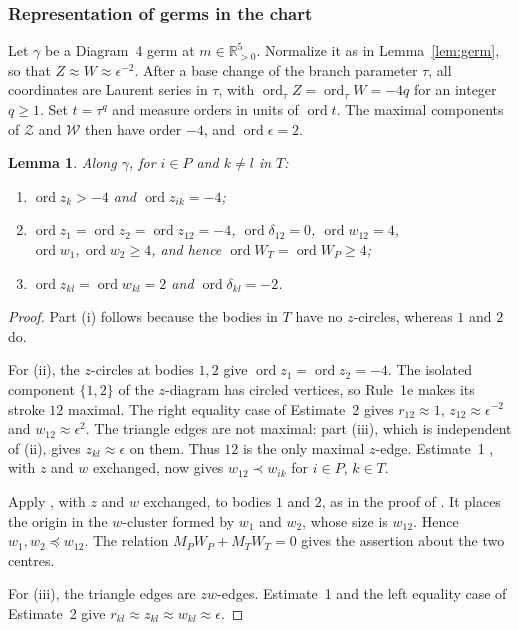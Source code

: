\documentclass[Threeside,11pt]{article}
\newtheorem{lemma}[theorem]{Lemma}
\theoremstyle{definition}
\theoremstyle{remark}
\numberwithin{equation}{section}
\theoremstyle{remark}
\newcommand{\Rp}{\mathbb{R}_{>0}}
\newcommand{\ord}{\operatorname{ord}}
\newenvironment{romanlist}{\begin{enumerate}\renewcommand{\labelenumi}{(\roman{enumi})}%
  \renewcommand{\theenumi}{\roman{enumi}}}{\end{enumerate}}
\begin{document}
\subsubsection{Representation of germs in the chart}\label{d4-cover}
{Let $\gamma$ be a Diagram~4 germ at $m\in\Rp^5$.
Normalize it as in Lemma~\ref{lem:germ}, so that $Z\approx W\approx\epsilon^{-2}$.
After a base change of the branch parameter $\tau$, all coordinates are Laurent series
in $\tau$, with $\ord_\tau Z=\ord_\tau W=-4q$ for an integer $q\ge1$.
Set $t=\tau^q$ and measure orders in units of $\ord t$.
The maximal components of $\mathcal Z$ and $\mathcal W$ then have order $-4$,
and $\ord\epsilon=2$.}

\begin{lemma}\label{lem:d4-val}
Along $\gamma$, for $i\in P$ and $k\ne l$ in $T$:
\begin{romanlist}
  \item $\ord z_k>-4$ and $\ord z_{ik}=-4$;
  \item $\ord z_1=\ord z_2=\ord z_{12}=-4$, $\ord\delta_{12}=0$, $\ord w_{12}=4$,
  $\ord w_1,\ord w_2\ge4$, and hence $\ord W_T=\ord W_P\ge4$;
  \item $\ord z_{kl}=\ord w_{kl}=2$ and $\ord\delta_{kl}=-2$.
\end{romanlist}
\end{lemma}

\begin{proof}
{Part (i) follows because the bodies in $T$ have no $z$-circles, whereas $1$ and $2$ do.

For (ii), the $z$-circles at bodies $1,2$ give $\ord z_1=\ord z_2=-4$.
The isolated component $\{1,2\}$ of the $z$-diagram has circled vertices, so Rule~1e
\cite[p.~546]{AK} makes its stroke $12$ maximal. The right equality case of Estimate~2
\cite[p.~548]{AK} gives $r_{12}\approx1$, $z_{12}\approx\epsilon^{-2}$ and
$w_{12}\approx\epsilon^2$. The triangle edges are not maximal: part (iii), which is independent
of (ii), gives $z_{kl}\approx\epsilon$ on them. Thus $12$ is the only maximal $z$-edge.
Estimate~1 \cite[p.~548]{AK}, with $z$ and $w$ exchanged, now gives $w_{12}\prec w_{ik}$
for $i\in P$, $k\in T$.

Apply \cite[Prop.~1, p.~559]{AK}, with $z$ and $w$ exchanged, to bodies $1$ and $2$,
as in the proof of \cite[Prop.~4, p.~564]{AK}. It places the origin in the $w$-cluster
formed by $w_1$ and $w_2$, whose size is $w_{12}$. Hence $w_1,w_2\preccurlyeq w_{12}$.
The relation $M_PW_P+M_TW_T=0$ gives the assertion about the two centres.

For (iii), the triangle edges are $zw$-edges. Estimate~1 and the left equality case
of Estimate~2 give $r_{kl}\approx z_{kl}\approx w_{kl}\approx\epsilon$.}
\end{proof}
\end{document}
